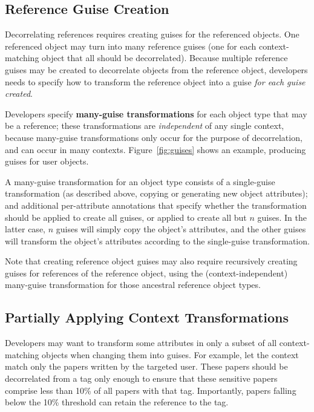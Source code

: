 \subsection{Reference Guise Creation}
\label{sec:reference_guises} 
%
Decorrelating references requires creating guises for the referenced objects. One referenced object may turn into many
reference guises (one for each context-matching object that all should be decorrelated).  Because
multiple reference guises may be created to decorrelate objects from the reference object,
developers needs to specify how to transform the reference object into a guise \emph{for each guise
created}.

%
Developers specify \textbf{many-guise transformations} for each object type that may be a reference;
these transformations are \emph{independent} of any single context, because many-guise
transformations only occur for the purpose of decorrelation, and can occur in many contexts.
%
Figure~\ref{fig:guises} shows an example, producing guises for user objects.

A many-guise transformation for an object type consists of a single-guise transformation (as
described above, \ie copying or generating new object attributes); and additional per-attribute
annotations that specify whether the transformation should be applied to create all guises, or
applied to create all but $n$ guises. In the latter case, $n$ guises will simply copy the
object's attributes, and the other guises will transform the object's attributes according to the
single-guise transformation.

Note that creating reference object guises may also require recursively creating guises for references of
the reference object, using the (context-independent) many-guise transformation for those ancestral reference
object types.

\subsection{Partially Applying Context Transformations}
\label{sec:threshold} 

Developers may want to transform some attributes in only a subset of all context-matching objects when
changing them into guises. 
For example, let the context match only the papers written by the targeted user. These papers should
be decorrelated from a tag only enough to ensure that these sensitive papers comprise less than 10\%
of all papers with that tag. Importantly, papers falling below the 10\% threshold can retain the
reference to the tag.

